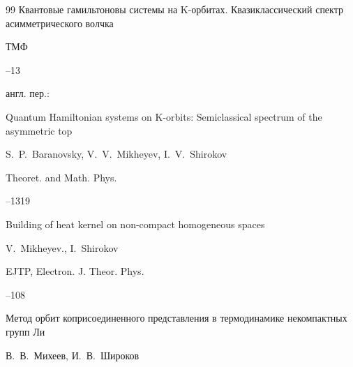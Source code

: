 \begin{thebibliography}{99}
\paper Квантовые гамильтоновы системы на K-орбитах. Квазиклассический спектр асимметрического волчка

\jour ТМФ




--13





\transl англ. пер.:~

\paper Quantum Hamiltonian systems on K-orbits: Semiclassical spectrum of the asymmetric top

\by S.~P.~Baranovsky, V.~V.~Mikheyev,  I.~V.~Shirokov

\jour Theoret. and Math. Phys.




--1319










\paper Building of heat kernel on non-compact homogeneous spaces

\by  V.~Mikheyev., I.~Shirokov

\jour EJTP, Electron. J. Theor. Phys.




--108






\paper Метод орбит коприсоединенного представления в термодинамике некомпактных групп Ли

\by   В.~В.~Михеев, И.~В.~Широков


\end{thebibliography}
